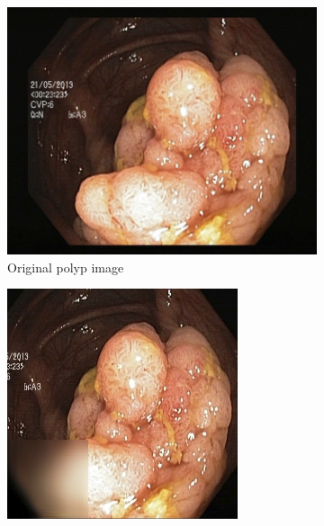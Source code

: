 \begin{figure}
                \tiny
        \begin{subfigure}[t]{\myfigsizethree}
            \centering
            \includegraphics[height=\textwidth ,width=\textwidth]{experiments/figures/greensquare/polypORIG.png}
            \caption{Original polyp image }   
            \label{fig:polyp_ORIG_SQUARE1}
        \end{subfigure}
        \qquad
        \begin{subfigure}[t]{\myfigsizethree}
            \centering
            \includegraphics[width=\textwidth]{experiments/figures/greensquare/polypAE.png}

\end{subfigure}
\end{figure}
